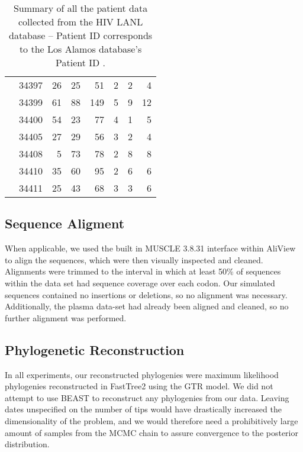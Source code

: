 \begin{table*}[!ht]
\begin{center}
\begin{tabular}{llrrrrrr}
& 34397 &      26 &       25 &       51 &        2 &        2 &        4  \\ 
& 34399 &      61 &       88 &      149 &        5 &        9 &       12  \\ 
& 34400 &      54 &       23 &       77 &        4 &        1 &        5  \\ 
& 34405 &      27 &       29 &       56 &        3 &        2 &        4  \\ 
& 34408 &       5 &       73 &       78 &        2 &        8 &        8 \\ 
& 34410 &      35 &       60 &       95 &        2 &        6 &        6 \\ 
& 34411 &      25 &       43 &       68 &        3 &        3 &        6   \\ \hline
\end{tabular}
\end{center}
  \caption{Summary of all the patient data collected from the HIV LANL database -- Patient ID corresponds to the Los Alamos database's Patient ID \citep{LosAlamos}.
   }\label{tab:patients} 
\end{table*}

\subsection{Sequence Aligment} \label{subsec:seqalign}
When applicable, we used the built in MUSCLE 3.8.31 \citep{Muscle04} interface within AliView \citep{AliView14} to align the sequences, which were then visually inspected and cleaned. 
Alignments were trimmed to the interval in which at least  50\% of sequences within the data set had sequence coverage over each codon.
Our simulated sequences contained no insertions or deletions, so no alignment was necessary. 
Additionally, the plasma data-set \citep{McCloskey14} had already been aligned and cleaned, so no further alignment was performed.


\subsection{Phylogenetic Reconstruction} \label{subsec:phylo}
In all experiments, our reconstructed phylogenies were maximum likelihood phylogenies reconstructed in FastTree2 \citep{FastTree10} using the GTR model.
We did not attempt to use BEAST \citep{BEAST} to reconstruct any phylogenies from our data.
Leaving dates unspecified on the number of tips would have drastically increased the dimensionality of the problem, and we would therefore need a prohibitively large amount of samples from the MCMC chain to assure convergence to the posterior distribution.

